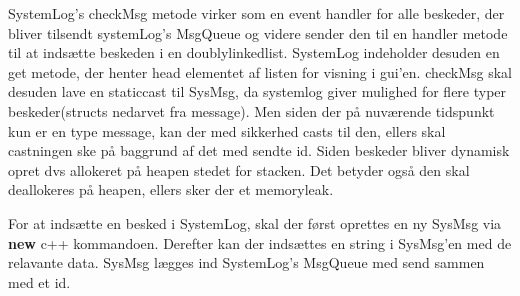 SystemLog's checkMsg metode virker som en event handler for alle beskeder, der bliver tilsendt systemLog's MsgQueue og videre sender den til en handler metode til at indsætte beskeden i en doublylinkedlist. SystemLog indeholder desuden en get metode, der henter head elementet af listen for visning i gui'en. checkMsg skal desuden lave en staticcast til SysMsg, da systemlog giver mulighed for flere typer beskeder(structs nedarvet fra message). Men siden der på nuværende tidspunkt kun er en type message, kan der med sikkerhed casts til den, ellers skal castningen ske på baggrund af det med sendte id. Siden beskeder bliver dynamisk opret dvs allokeret på heapen stedet for stacken. Det betyder også den skal deallokeres på heapen, ellers sker der et memoryleak. 



For at indsætte en besked i SystemLog, skal der først oprettes en ny SysMsg via \textbf{new} c++ kommandoen. Derefter kan der indsættes en string i SysMsg'en med de relavante data. SysMsg lægges ind SystemLog's MsgQueue med send sammen med et id.
